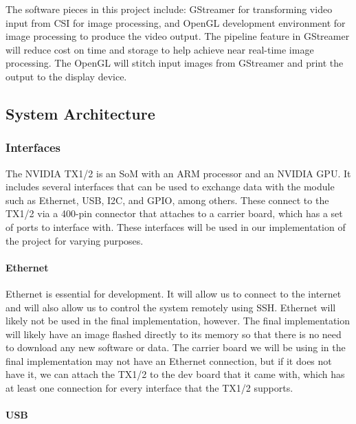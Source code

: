 The software pieces in this project include: GStreamer for transforming video input 
from CSI for image processing, and OpenGL development environment for image processing 
to produce the video output. The pipeline feature in GStreamer will reduce 
cost on time and storage to help achieve near real-time image processing. The OpenGL 
will stitch input images from GStreamer and print the output to the display device. \\

\subsection{System Architecture}

\subsubsection{Interfaces}

The NVIDIA TX1/2 is an SoM with an ARM processor and an NVIDIA GPU. It includes several 
interfaces that can be used to exchange data with the module such as Ethernet, USB, 
I2C, and GPIO, among others. These connect to the TX1/2 via a 400-pin connector that 
attaches to a carrier board, which has a set of ports to interface with. These 
interfaces will be used in our implementation of the project for varying purposes. \\

\paragraph{Ethernet}

Ethernet is essential for development. It will allow us to connect to the internet and 
will also allow us to control the system remotely using SSH. Ethernet will likely not 
be used in the final implementation, however. The final implementation will likely 
have an image flashed directly to its memory so that there is no need to download any 
new software or data. The carrier board we will be using in the final implementation 
may not have an Ethernet connection, but if it does not have it, we can attach the TX1/2 
to the dev board that it came with, which has at least one connection for every 
interface that the TX1/2 supports. \\

\paragraph{USB}

